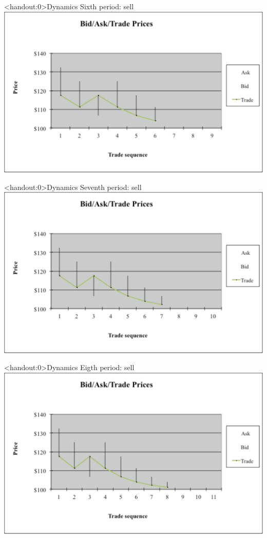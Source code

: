 \documentclass[english,10pt
,aspectratio=169
]{beamer}
\begin{document}
\begin{frame}<handout:0>{Dynamics}
	Sixth period: sell
	\center
	\includegraphics[width=0.9\linewidth]{pics/P6_Image.pdf}
\end{frame}


\begin{frame}<handout:0>{Dynamics}
	Seventh period: sell
	\center
	\includegraphics[width=0.9\linewidth]{pics/P7_Image.pdf}
\end{frame}


\begin{frame}<handout:0>{Dynamics}
	Eigth period: sell
	\center
	\includegraphics[width=0.9\linewidth]{pics/P8_Image.pdf}
\end{frame}
\end{document}
